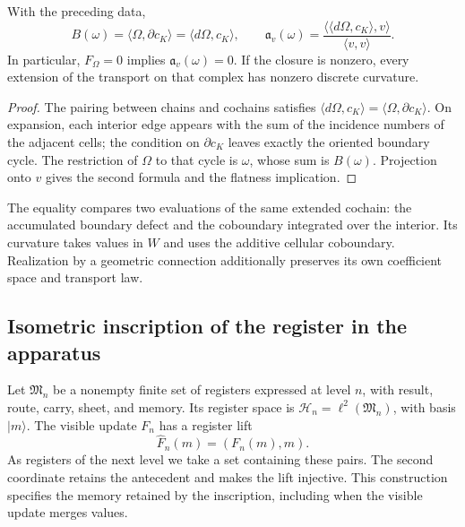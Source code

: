 \begin{theorem}
\label{vii:thm:observador-stokes}
With the preceding data,
\begin{equation}
 B(\omega)=\langle\Omega,\partial c_K\rangle
          =\langle d\Omega,c_K\rangle,
 \qquad
 \mathfrak a_v(\omega)
 =\frac{\langle\langle d\Omega,c_K\rangle,v\rangle}
        {\langle v,v\rangle}.
 \label{vii:eq:observador-stokes}
\end{equation}
In particular, \(F_\Omega=0\) implies \(\mathfrak a_v(\omega)=0\).
If the closure is nonzero, every extension of the transport on that complex
has nonzero discrete curvature.
\end{theorem}

\begin{proof}
The pairing between chains and cochains satisfies
\(\langle d\Omega,c_K\rangle=\langle\Omega,\partial c_K\rangle\).
On expansion, each interior edge appears with the sum of the incidence
numbers of the adjacent cells; the condition on
\(\partial c_K\) leaves exactly the oriented boundary cycle.
The restriction of \(\Omega\) to that cycle is \(\omega\), whose sum
is \(B(\omega)\). Projection onto \(v\) gives the second formula
and the flatness implication.
\end{proof}

The equality compares two evaluations of the same extended cochain:
the accumulated boundary defect and the coboundary integrated over the interior.
Its curvature takes values in \(W\) and uses the additive cellular coboundary.
Realization by a geometric connection additionally preserves
its own coefficient space and transport law.

\subsection{Isometric inscription of the register in the apparatus}
\label{vii:sec:observador-aparato}

Let \(\mathfrak M_n\) be a nonempty finite set of registers
expressed at level \(n\), with result, route, carry, sheet, and memory.
Its register space is
\(\mathcal H_n=\ell^2(\mathfrak M_n)\), with basis \(|m\rangle\).
The visible update \(F_n\) has a register lift
\[
 \widehat F_n(m)=(F_n(m),m).
\]
As registers of the next level we take a set containing these
pairs. The second coordinate retains the antecedent and makes the
lift injective. This construction specifies the memory retained by
the inscription, including when the visible update merges values.

